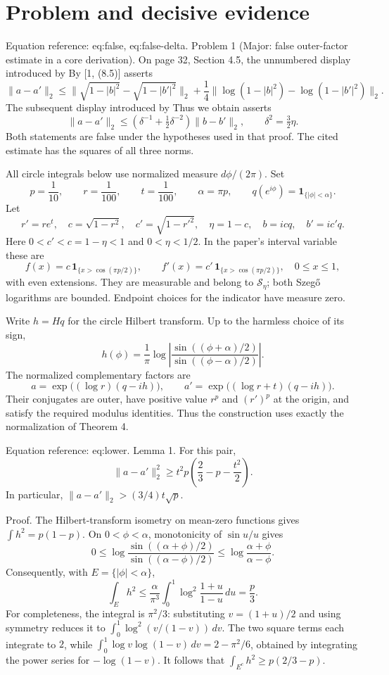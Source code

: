 \documentclass[10pt]{article}
\begin{document}
\section*{Problem and decisive evidence}
Equation reference: eq:false, eq:false-delta. Problem 1 (Major: false outer-factor estimate in a core derivation).  On page 32, Section 4.5, the unnumbered display introduced by By [1, (8.5)] asserts \[
 \|a-a'\|_2\leq
 \big\|\sqrt{1-|b|^2}-\sqrt{1-|b'|^2}\big\|_2
 +\frac14\big\|\log(1-|b|^2)-\log(1-|b'|^2)\big\|_2.\] The subsequent display introduced by Thus we obtain asserts \[
 \|a-a'\|_2\leq(\delta^{-1}+\tfrac12\delta^{-2})\|b-b'\|_2,
 \qquad \delta^2=\tfrac32\eta .\] Both statements are false under the hypotheses used in that proof. The cited estimate has the squares of all three norms.\par
All circle integrals below use normalized measure \(d\phi/(2\pi)\). Set \[p=\frac1{10},\qquad r=\frac1{100},\qquad t=\frac1{100},\qquad
 \alpha=\pi p,\qquad
 q(e^{i\phi})=\mathbf1_{\{|\phi|<\alpha\}}.\] Let \[r'=re^t,\quad c=\sqrt{1-r^2},\quad c'=\sqrt{1-r'^2},\quad
 \eta=1-c,\quad b=icq,\quad b'=ic'q.\] Here \(0<c'<c=1-\eta<1\) and \(0<\eta<1/2\). In the paper’s interval variable these are \[f(x)=c\,\mathbf1_{\{x>\cos(\pi p/2)\}},\qquad
 f'(x)=c'\,\mathbf1_{\{x>\cos(\pi p/2)\}},
 \quad 0\leq x\leq1,\] with even extensions. They are measurable and belong to \(\mathcal S_\eta\); both Szegő logarithms are bounded. Endpoint choices for the indicator have measure zero.\par
Write \(h=Hq\) for the circle Hilbert transform. Up to the harmless choice of its sign, \[h(\phi)=\frac1\pi\log\left|
       \frac{\sin((\phi+\alpha)/2)}{\sin((\phi-\alpha)/2)}
                         \right|.\] The normalized complementary factors are \[a=\exp\big((\log r)(q-ih)\big),\qquad
 a'=\exp\big((\log r+t)(q-ih)\big).\] Their conjugates are outer, have positive value \(r^p\) and \((r')^p\) at the origin, and satisfy the required modulus identities. Thus the construction uses exactly the normalization of Theorem 4.\par
Equation reference: eq:lower. Lemma 1.  For this pair, \[
 \|a-a'\|_2^2\geq
 t^2p\left(\frac23-p-\frac{t^2}{2}\right).\] In particular, \(\|a-a'\|_2>(3/4)t\sqrt p\).\par
Proof. The Hilbert-transform isometry on mean-zero functions gives \(\int h^2=p(1-p)\). On \(0<\phi<\alpha\), monotonicity of \(\sin u/u\) gives \[0\leq\log\frac{\sin((\alpha+\phi)/2)}
                       {\sin((\alpha-\phi)/2)}
 \leq\log\frac{\alpha+\phi}{\alpha-\phi}.\] Consequently, with \(E=\{|\phi|<\alpha\}\), \[\int_E h^2\leq
 \frac{\alpha}{\pi^3}\int_0^1
       \log^2\frac{1+u}{1-u}\,du
 =\frac p3.\] For completeness, the integral is \(\pi^2/3\): substituting \(v=(1+u)/2\) and using symmetry reduces it to \(\int_0^1\log^2(v/(1-v))\,dv\). The two square terms each integrate to \(2\), while \(\int_0^1\log v\log(1-v)\,dv=2-\pi^2/6\), obtained by integrating the power series for \(-\log(1-v)\). It follows that \(\int_{E^c}h^2\geq p(2/3-p)\).\par
\end{document}
